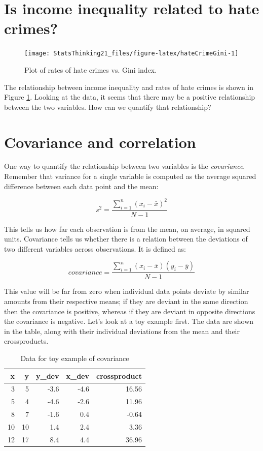\documentclass[12pt,]{book}
\theoremstyle{definition}
\theoremstyle{definition}
\theoremstyle{definition}
\theoremstyle{remark}
\begin{document}
\hypertarget{is-income-inequality-related-to-hate-crimes}{%
\section{Is income inequality related to hate crimes?}\label{is-income-inequality-related-to-hate-crimes}}

\begin{figure}
\texttt{[image: StatsThinking21\_files/figure-latex/hateCrimeGini-1]} \caption{Plot of rates of hate crimes vs. Gini index.}\label{fig:hateCrimeGini}
\end{figure}

The relationship between income inequality and rates of hate crimes is shown in Figure \ref{fig:hateCrimeGini}.
Looking at the data, it seems that there may be a positive relationship between the two variables. How can we quantify that relationship?

\hypertarget{covariance-and-correlation}{%
\section{Covariance and correlation}\label{covariance-and-correlation}}

One way to quantify the relationship between two variables is the \emph{covariance}. Remember that variance for a single variable is computed as the average squared difference between each data point and the mean:

\[
s^2 = \frac{\sum_{i=1}^n (x_i - \bar{x})^2}{N - 1}
\]

This tells us how far each observation is from the mean, on average, in squared units. Covariance tells us whether there is a relation between the deviations of two different variables across observations. It is defined as:

\[
covariance = \frac{\sum_{i=1}^n (x_i - \bar{x})(y_i - \bar{y})}{N - 1}
\]

This value will be far from zero when individual data points deviate by similar amounts from their respective means; if they are deviant in the same direction then the covariance is positive, whereas if they are deviant in opposite directions the covariance is negative. Let's look at a toy example first. The data are shown in the table, along with their individual deviations from the mean and their crossproducts.

\begin{table}

\caption{\label{tab:unnamed-chunk-91}Data for toy example of covariance}
\centering
\begin{tabular}[t]{r|r|r|r|r}
\hline
x & y & y\_dev & x\_dev & crossproduct\\
\hline
3 & 5 & -3.6 & -4.6 & 16.56\\
\hline
5 & 4 & -4.6 & -2.6 & 11.96\\
\hline
8 & 7 & -1.6 & 0.4 & -0.64\\
\hline
10 & 10 & 1.4 & 2.4 & 3.36\\
\hline
12 & 17 & 8.4 & 4.4 & 36.96\\
\hline
\end{tabular}
\end{table}
\end{document}
